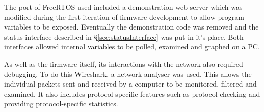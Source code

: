 			The port of FreeRTOS used included a demonstration web server which was
			modified during the first iteration of firmware development to allow
			program variables to be exposed. Eventually the demonstration code was
			removed and the status interface described in \S\ref{sec:statusInterface}
			was put in it's place. Both interfaces allowed internal variables to be
			polled, examined and graphed on a PC.
			
			As well as the firmware itself, its interactions with the network also
			required debugging. To do this Wireshark, a network analyser was used.
			This allows the individual packets sent and received by a computer to be
			monitored, filtered and examined. It also includes protocol specific
			features such as protocol checking and providing protocol-specific
			statistics.
